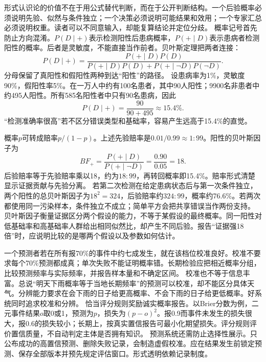  形式认识论的价值不在于用公式替代判断，而在于公开判断结构。一个后验概率必须说明先验、似然与条件独立；一个决策必须说明可能结果和效用；一个专家汇总必须说明权重。读者可以不同意输入，却能复算结论并定位分歧。 概率记号首先防止方向混淆。$P(D\mid +)$表示检测阳性后患病概率，$P(+\mid D)$表示患病者检测阳性的概率。后者是灵敏度，不能直接当作前者。贝叶斯定理把两者连接：
\[
P(D\mid +)=\frac{P(+\mid D)P(D)}
{P(+\mid D)P(D)+P(+\mid \neg D)P(\neg D)}.
\]
分母保留了真阳性和假阳性两种到达“阳性”的路径。 设患病率为1\%，灵敏度90\%，假阳性率5\%。在一万人中约有100名患者，其中90人阳性；9900名非患者中约495人阳性。所有585名阳性者中只有90名患病，因此
\[
P(D\mid +)=\frac{90}{90+495}\approx15.4\%.
\]
“检测准确率很高”若不区分错误类型和基础率，容易产生远高于15.4\%的直觉。

概率$p$可转成赔率$p/(1-p)$。上述先验赔率是$0.01/0.99\approx1:99$。阳性的贝叶斯因子为
\[
BF_+=\frac{P(+\mid D)}{P(+\mid\neg D)}=\frac{0.90}{0.05}=18.
\]
后验赔率等于先验赔率乘以18，约为$18:99$，再转回概率即15.4\%。赔率形式清楚显示证据贡献与先验分离。 若第二次检测在给定患病状态后与第一次条件独立，两个阳性的总贝叶斯因子为$18^2=324$，后验赔率约$324:99$，概率约76.6\%。若两次都使用同一污染样本，条件独立不成立；简单平方会把共享错误当作两份支持。 贝叶斯因子衡量证据区分两个假设的能力，不等于某假设的最终概率。同一阳性对低基础率和高基础率人群给出相同似然比，却产生不同后验。报告“证据强18倍”时，应说明比较的是哪两个假设以及参数如何估计。

一个预测者若在所有报70\%的事件中约七成发生，就在该档位校准良好。校准不要求每个70\%预测都成真；单次失败不能证明概率错。长期检验应把相近概率分组，比较预测频率与实际频率，并报告样本量和不确定区间。 校准也不等于信息丰富。总说“明天下雨概率等于当地长期频率”的预测可以校准，却不能区分具体天气。分辨能力要求在会下雨的日子给更高概率、不会下雨的日子给更低概率。好系统同时追求校准和分辨。 恰当评分规则奖励诚实概率报告。以Brier分数为例，二元事件结果$o$取0或1，预测为$p$，损失为$(p-o)^2$。报0.9而事件未发生的损失很大，报0.6的损失较小；长期上，按真实置信报告可最小化期望损失。评分规则评价置信质量，不自动判定主体是否拥有知识\parencite{joyce1998}。 预测系统还需防止选择性展示。只公布成功的高置信预测、删除失败记录，会制造虚假校准。应在结果发生前锁定预测、保存全部版本并预先规定评估窗口。形式透明依赖记录制度。

